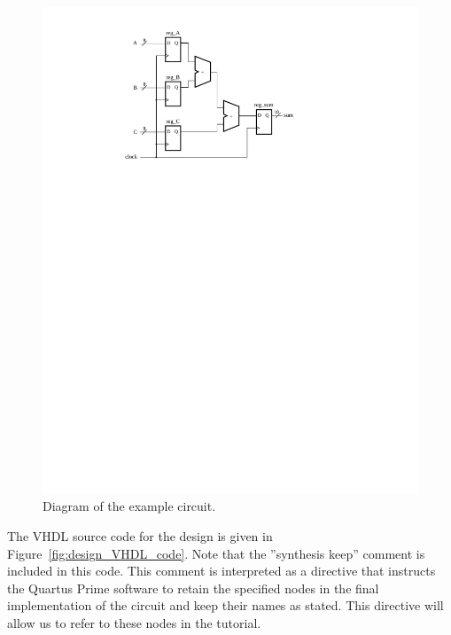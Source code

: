 \documentclass[11pt, twoside, pdftex]{article}
\begin{document}
\begin{figure}[H]
\begin{center}
\includegraphics[scale=.75]{figures/design_example.pdf}
\end{center}
\caption{Diagram of the example circuit.}
\label{fig:design_example}
\end{figure}

The VHDL source code for the design is given in Figure~\ref{fig:design_VHDL_code}. Note that the ''synthesis keep''
comment is included in this code. This comment is interpreted as a directive that
instructs the Quartus Prime software to retain the specified
nodes in the final implementation of the circuit and keep their names as stated. This directive will allow us to refer to these nodes
in the tutorial. 
\end{document}
